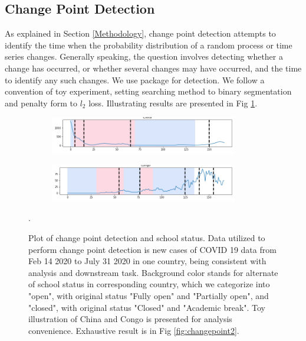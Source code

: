 \documentclass{article}
\begin{document}
\subsection{Change Point Detection}
As explained in Section \ref{Methodology}, change point detection attempts to identify the time when the probability distribution of a random process or time series changes. Generally speaking, the question involves detecting whether a change has occurred, or whether several changes may have occurred, and the time to identify any such changes. We use package \cite{Ruptures} for detection. We follow a convention of toy experiment, setting searching method to binary segmentation and penalty form to $l_2$ loss. Illustrating results are presented in Fig \ref{fig:changepoint1}. 




    \begin{figure}[ht!]
\centering

    \begin{subfigure}{\textwidth}
    	\centering
        \includegraphics[width=0.9\textwidth]{_China.png}
    \end{subfigure}
    \begin{subfigure}{\textwidth}
    	\centering
        \includegraphics[width=0.9\textwidth]{_Congo.png}
    \end{subfigure}
  
    \caption{Plot of change point detection and school status. Data utilized to perform change point detection is new cases of COVID 19 data from Feb 14 2020 to July 31 2020 in one country, being consistent with analysis and downstream task. Background color stands for alternate of school status in corresponding country, which we categorize into "open", with original status "Fully open" and "Partially open", and "closed", with original status "Closed" and "Academic break". Toy illustration of China and Congo is presented for analysis convenience. Exhaustive result is in Fig \ref{fig:changepoint2}. }.
\label{fig:changepoint1}
\end{figure}
\end{document}
